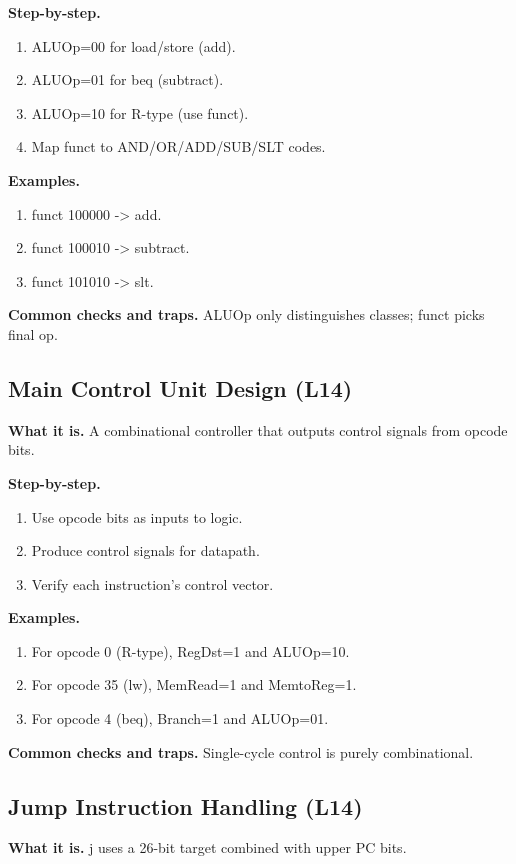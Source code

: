 \documentclass[11pt]{article}
\begin{document}
\textbf{Step-by-step.}
\begin{enumerate}[leftmargin=*]
  \item ALUOp=00 for load/store (add).
  \item ALUOp=01 for beq (subtract).
  \item ALUOp=10 for R-type (use funct).
  \item Map funct to AND/OR/ADD/SUB/SLT codes.
\end{enumerate}

\textbf{Examples.}
\begin{enumerate}[leftmargin=*]
  \item funct 100000 -> add.
  \item funct 100010 -> subtract.
  \item funct 101010 -> slt.
\end{enumerate}

\textbf{Common checks and traps.} ALUOp only distinguishes classes; funct picks final op.

\subsection{Main Control Unit Design (L14)}
\textbf{What it is.} A combinational controller that outputs control signals from opcode bits.

\textbf{Step-by-step.}
\begin{enumerate}[leftmargin=*]
  \item Use opcode bits as inputs to logic.
  \item Produce control signals for datapath.
  \item Verify each instruction's control vector.
\end{enumerate}

\textbf{Examples.}
\begin{enumerate}[leftmargin=*]
  \item For opcode 0 (R-type), RegDst=1 and ALUOp=10.
  \item For opcode 35 (lw), MemRead=1 and MemtoReg=1.
  \item For opcode 4 (beq), Branch=1 and ALUOp=01.
\end{enumerate}

\textbf{Common checks and traps.} Single-cycle control is purely combinational.

\subsection{Jump Instruction Handling (L14)}
\textbf{What it is.} j uses a 26-bit target combined with upper PC bits.
\end{document}
